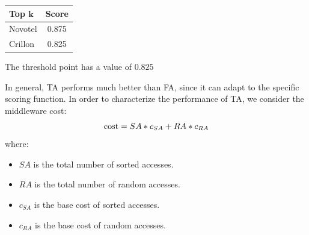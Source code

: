 \documentclass[12pt, a4paper]{report}
\newtheorem[style=M,bodystyle=\normalfont]{theorem}{Theorem}
\newtheorem[style=M,bodystyle=\normalfont]{corollary}{Corollary}
\newtheorem[style=M,bodystyle=\normalfont]{lemma}{Lemma}
\newtheorem[style=M,bodystyle=\normalfont]{definition}{Definition}
\begin{document}
\begin{example}
        \begin{table}[H]
            \centering
            \begin{tabular}{|lc|}
            \hline
            \textbf{Top $\boldsymbol{k}$} & \textbf{Score} \\ \hline
            Novotel                       & 0.875          \\ 
            Crillon                       & 0.825          \\ \hline
            \end{tabular}
        \end{table}
        The threshold point has a value of $0.825$
    \end{example}
    In general, TA performs much better than FA, since it can adapt to the specific scoring function. In order to characterize the 
    performance of TA, we consider the middleware cost: 
    \[\textnormal{cost} = SA*c_{SA} + RA*c_{RA}\]
    where:
    \begin{itemize}
        \item $SA$ is the total number of sorted accesses.
        \item $RA$ is the total number of random accesses.
        \item $c_{SA}$ is the base cost of sorted accesses.
        \item $c_{RA}$ is the base cost of random accesses.
    \end{itemize}
\end{document}
